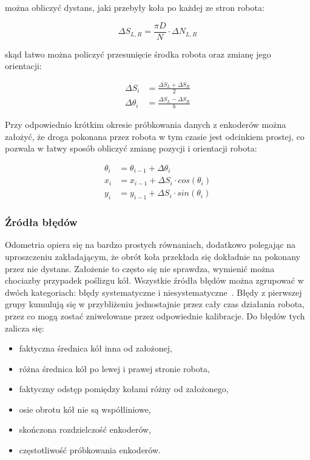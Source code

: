 można obliczyć dystans, jaki przebyły koła po każdej ze stron robota:

\[
\Delta S_{L,R} = \frac{\pi D}{N} \cdot \Delta N_{L,R}
\]

skąd łatwo można policzyć przesunięcie środka robota oraz zmianę jego
orientacji:

\begin{align*}
\Delta S_i &= \frac{\Delta S_L + \Delta S_R}{2} \\
\Delta \theta_i &= \frac{\Delta S_L - \Delta S_R}{b}
\end{align*}

Przy odpowiednio krótkim okresie próbkowania danych z enkoderów można założyć,
że droga pokonana przez robota w tym czasie jest odcinkiem prostej, co pozwala w
łatwy sposób obliczyć zmianę pozycji i orientacji robota:

\begin{align*}
\theta_i &= \theta_{i-1} + \Delta \theta_i \\
x_i &= x_{i-1} + \Delta S_i \cdot cos(\theta_i) \\ 
y_i &= y_{i-1} + \Delta S_i \cdot sin(\theta_i) 
\end{align*}


\subsubsection{Źródła błędów}

Odometria opiera się na bardzo prostych równaniach, dodatkowo polegając na
uproszczeniu zakładającym, że obrót koła przekłada się dokładnie na pokonany
przez nie dystans. Założenie to często się nie sprawdza, wymienić można
chociazby przypadek poślizgu kół. Wszystkie źródła błędów można zgrupować w
dwóch kategoriach: błędy systematyczne i niesystematyczne~\cite{whereami}.
Błędy z pierwszej grupy kumulują się w przybliżeniu jednostajnie przez cały czas
działania robota, przez co mogą zostać zniwelowane przez odpowiednie kalibracje.
Do błędów tych zalicza się:
\begin{itemize}
  \item faktyczna średnica kół inna od założonej,
  \item różna średnica kół po lewej i prawej stronie robota,
  \item faktyczny odstęp pomiędzy kołami różny od założonego,
  \item osie obrotu kół nie są współliniowe,
  \item skończona rozdzielczość enkoderów,
  \item częstotliwość próbkowania enkoderów.
\end{itemize}

